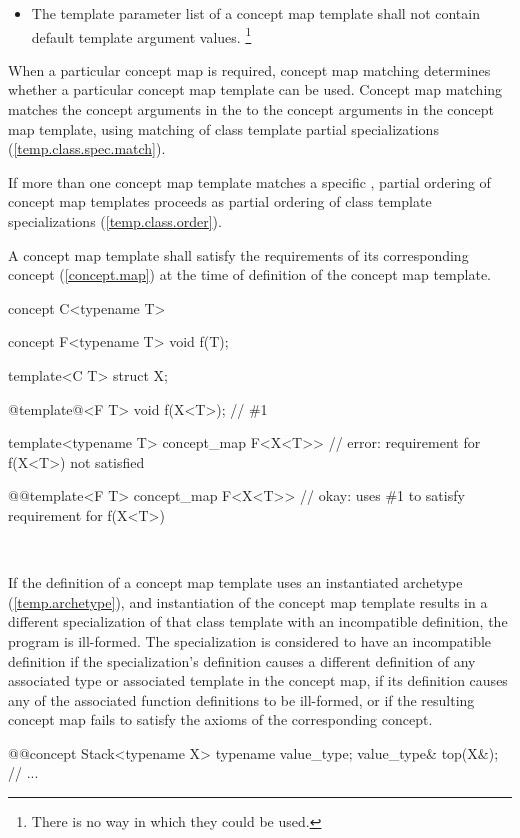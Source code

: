 \documentclass[american]{book}
\begin{document}
\begin{paras}
\begin{itemize}
\item
The template parameter list of a concept map template shall not contain default
template argument values.%
\footnote{
There is no way in which they could be used.
}
\end{itemize}

\pnum 
When a particular concept map is required, concept map matching
determines whether a 
particular concept map template can be used. Concept map matching
matches the concept arguments in the
\mbox{} to the 
concept arguments in the concept map template, using matching of class
template partial specializations (\ref{temp.class.spec.match}). 

\pnum
If more than one concept map template matches a specific
\mbox{}, partial ordering of concept map templates 
proceeds as partial ordering of class template specializations
(\ref{temp.class.order}).

\pnum
A concept map template shall satisfy the requirements of its corresponding
concept (\ref{concept.map}) at the time of definition of the concept
map template. \enterexample\
\begin{codeblock}
concept C<typename T> { }

concept F<typename T> {
  void f(T);
}

template<C T> struct X;

@\textcolor{addclr}{template}@<F T> void f(X<T>); // \#1

template<typename T>
concept_map F<X<T>> { } // error: requirement for f(X<T>) not satisfied

@\textcolor{addclr}{}@template<F T>
concept_map F<X<T>> { } // okay: uses \#1 to satisfy requirement for f(X<T>)
\end{codeblock}
\exitexample\

\pnum
If the definition of a concept map template uses an instantiated archetype
(\ref{temp.archetype}), and instantiation of the 
concept map template 
results in a different specialization of that class
template with an incompatible definition, the program is
ill-formed. The specialization is considered to have an incompatible
definition if the specialization's definition causes a different
definition of any associated type or associated template in the
concept map, if its definition causes any of the associated
function definitions to be ill-formed, or if the resulting concept map
fails to satisfy the axioms of the corresponding concept. 
\enterexample\
\begin{codeblock}
@\textcolor{addclr}{}@concept Stack<typename X> {
  typename value_type;
  value_type& top(X&);
  // ...
}


\end{codeblock}
\end{paras}
\end{document}
